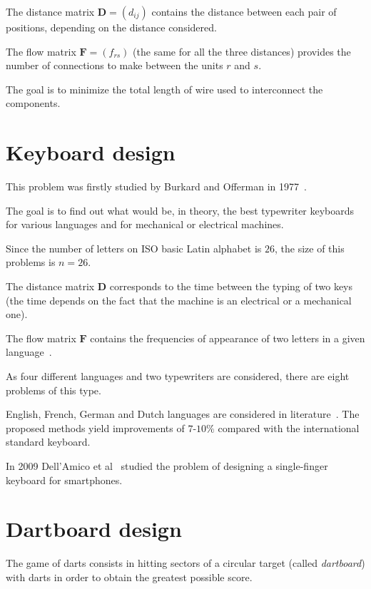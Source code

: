 The distance matrix $\bm D=(d_{ij})$ contains the distance between each pair of positions, depending on the distance considered.


 The flow matrix  $\bm F=(f_{rs})$ (the same for all the three distances) provides the number of connections to make between the units $r$ and $s$. 
 
 The goal is to minimize the total length of wire used to interconnect the components.
 

\section{Keyboard design}
\label{sec:Keyboard}

This problem was firstly studied by Burkard and Offerman in 1977~\cite{Burkard1977}.

The goal is to find out what would be, in theory, the best typewriter keyboards for various languages and for mechanical or electrical machines. 

Since the number of letters on \textsc{ISO} basic Latin alphabet is $26$, the size of this problems is  $n = 26$. 

The distance matrix $\bm D$ corresponds to the time between
the typing of two keys (the time depends on the fact that the machine is an electrical or a
mechanical one).

The flow matrix $\bm F$ contains the frequencies of appearance of two letters in a given language~\cite{Taillard1995}.

As four different languages and two typewriters are considered, there
are eight problems of this type. 



English, French, German and Dutch languages are considered in literature~\cite{Taillard1995}. 
The proposed methods yield improvements
of $7$-$10\%$ compared with the international standard keyboard.

In 2009  Dell'Amico et al~\cite{DellAmico2009} studied the problem of designing a single-finger keyboard for smartphones.


\section{Dartboard design}
\label{sec:Darboard}
The game of darts consists in hitting sectors of a circular target (called \textit{dartboard}) with darts in order to obtain the greatest possible score. 

